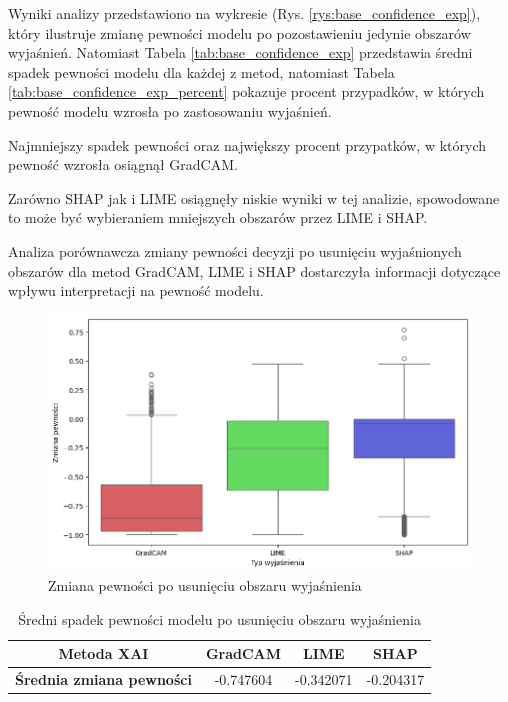 Wyniki analizy przedstawiono na wykresie (Rys. \ref{rys:base_confidence_exp}), który ilustruje zmianę pewności modelu po pozostawieniu jedynie obszarów wyjaśnień.
Natomiast Tabela \ref{tab:base_confidence_exp} przedstawia średni spadek pewności modelu dla każdej z metod, natomiast Tabela \ref{tab:base_confidence_exp_percent} pokazuje procent przypadków, w których pewność modelu wzrosła po zastosowaniu wyjaśnień.

Najmniejszy spadek pewności oraz największy procent przypatków, w których pewność wzrosła osiągnął GradCAM.

Zarówno SHAP jak i LIME osiągnęły niskie wyniki w tej analizie, spowodowane to może być wybieraniem mniejszych obszarów przez LIME i SHAP.

\vspace{1cm}

Analiza porównawcza zmiany pewności decyzji po usunięciu wyjaśnionych obszarów dla metod GradCAM, LIME i SHAP dostarczyła informacji dotyczące wpływu interpretacji na pewność modelu.

\begin{figure}[h]
	\centering\includegraphics[width=.9\textwidth]{img/base_confidence_no_exp}
	\caption{Zmiana pewności po usunięciu obszaru wyjaśnienia}  \label{rys:base_confidence_no_exp}
\end{figure}

\begin{table}[h]
	\centering
	\begin{tabular}{|c|c|c|c|}
		\hline
		\textbf{Metoda XAI}              & \textbf{GradCAM} & \textbf{LIME} & \textbf{SHAP} \\
		\hline
		\textbf{Średnia zmiana pewności} & -0.747604        & -0.342071     & -0.204317     \\
		\hline
	\end{tabular}
	\caption{Średni spadek pewności modelu po usunięciu obszaru wyjaśnienia}
	\label{tab:base_confidence_no_exp}
\end{table}

